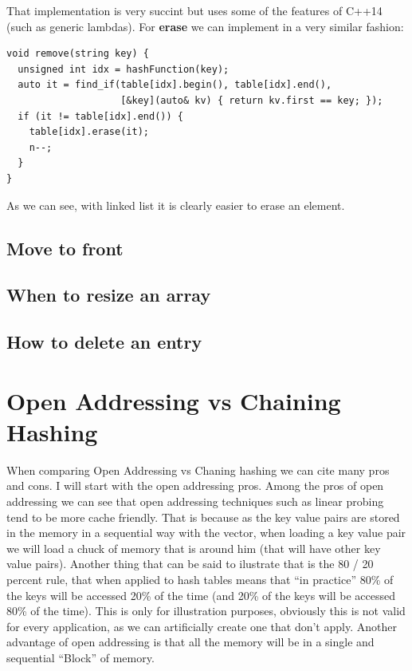 That implementation is very succint but uses some of the features of C++14 (such as generic lambdas). For \textbf{erase} we can implement in a very similar fashion:

\begin{lstlisting}
void remove(string key) {
  unsigned int idx = hashFunction(key);
  auto it = find_if(table[idx].begin(), table[idx].end(),
                    [&key](auto& kv) { return kv.first == key; });
  if (it != table[idx].end()) {
    table[idx].erase(it);
    n--;
  }
}
\end{lstlisting}

As we can see, with linked list it is clearly easier to erase an element. 

\subsection{Move to front}

\subsection{When to resize an array}

\subsection{How to delete an entry}

\section{Open Addressing vs Chaining Hashing}

When comparing Open Addressing vs Chaning hashing we can cite many pros and cons. I will start with the open addressing pros. Among the pros of open addressing we can see that open addressing techniques such as linear probing tend to be more cache friendly. That is because as the key value pairs are stored in the memory in a sequential way with the vector, when loading a key value pair we will load a chuck of memory that is around him (that will have other key value pairs). Another thing that can be said to ilustrate that is the 80 / 20 percent rule, that when applied to hash tables means that ``in practice'' 80\% of the keys will be accessed 20\% of the time (and 20\% of the keys will be accessed 80\% of the time). This is only for illustration purposes, obviously this is not valid for every application, as we can artificially create one that don't apply. Another advantage of open addressing is that all the memory will be in a single and sequential ``Block'' of memory. 